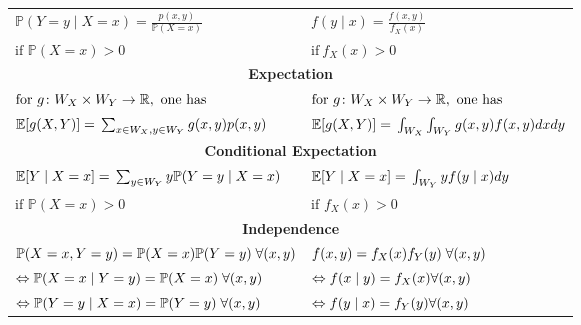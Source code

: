 {\begin{tabularx}{\linewidth}{p{.5\linewidth} p{.5\linewidth}}
        $\mathbb{P}(Y=y\mid X=x)=\frac{p(x,y)}{\mathbb{P}(X=x)}$                          & $f(y\mid x)=\frac{f(x,y)}{f_X(x)}$                                       \\
        $\text{if }\mathbb{P}(X=x)>0$                                                     & $\mathrm{if~}f_X(x)>0$                                                   \\
        \multicolumn{2}{c}{\textbf{Expectation}}                                                                                                                     \\
        $\text{for }g\colon W_X\times W_Y\to\mathbb{R},\newline \text{ one has}$          & $\text{for }g\colon W_X\times W_Y\to\mathbb{R},\newline \text{ one has}$ \\
        $\mathbb{E}[g(X,Y)]=\newline\sum_{x\in W_X,y\in W_Y}g(x,y)p(x,y)$                 & $\mathbb{E}[g(X,Y)]=\newline\int_{W_X}\int_{W_Y}g(x,y)f(x,y)dxdy$        \\
        \multicolumn{2}{c}{\textbf{Conditional Expectation}}                                                                                                         \\
        $\mathbb{E}[Y\mid X=x]=\newline \sum_{y\in W_Y}y\mathbb{P}(Y=y\mid X=x)$          & $\mathbb{E}[Y\mid X=x]=\newline \int_{W_Y}yf(y\mid x)dy$                 \\
        $\text{if }\mathbb{P}(X=x)>0$                                                     & $\text{if }f_X(x)>0$                                                     \\
        \multicolumn{2}{c}{\textbf{Independence}}                                                                                                                    \\
        $\mathbb{P}(X=x,Y=y)=\newline \mathbb{P}(X=x)\mathbb{P}(Y=y)\; \forall(x,y)$      & $f(x,y)=\newline f_X(x)f_Y(y)\; \forall(x,y)$                            \\
        $\Leftrightarrow\mathbb{P}(X=x\mid Y=y)=\newline \mathbb{P}(X=x)\; \forall(x,y)$  & $\Leftrightarrow f(x\mid y) =f_X(x)\newline\forall(x,y)$                 \\
        $\Leftrightarrow\mathbb{P}(Y=y\mid X=x)=\newline \mathbb{P}(Y=y)\; \forall(x,y) $ & $\Leftrightarrow f(y\mid x) =f_Y(y)\newline\forall(x,y)$                 \\
    \end{tabularx}
} %

\renewcommand{\arraystretch}{1}
\setlength\tabcolsep{\oldtabcolsep}
